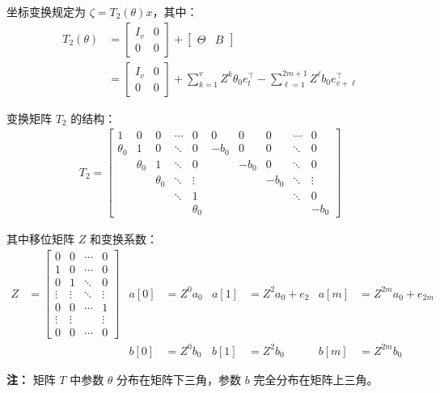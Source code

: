 \documentclass[12pt,a4paper]{article}
\begin{document}
坐标变换规定为 $\zeta = T_2(\theta) x$，其中：
\begin{align*}
T_2(\theta) &=
\begin{bmatrix}
I_v & 0 \\
0 & 0
\end{bmatrix} +
\left[
\begin{array}{c|c}
\Theta & B
\end{array}
\right] \\
&= \begin{bmatrix}
I_v & 0 \\
0 & 0
\end{bmatrix}
+ \sum_{k=1}^{v} Z^k \theta_0 e_t^\top
- \sum_{\ell=1}^{2m+1} Z^{\ell} b_0 e_{v+\ell}^\top
\end{align*}

变换矩阵 $T_2$ 的结构：
{\small
\begin{align*}
T_2 =
\left[
\begin{array}{ccccc|ccccc}
1 & 0 & 0 & \cdots & 0 & 0 & 0 & 0 & \cdots & 0 \\
\theta_0 & 1 & 0 & \ddots & 0 & -b_0 & 0 & 0 & \ddots & 0 \\
 & \theta_0 & 1 & \ddots & 0 &  & -b_0 & 0 & \ddots & 0 \\
 &  & \theta_0 & \ddots & \vdots &  &  & -b_0 & \ddots & \vdots \\
 &  &  & \ddots & 1 &  &  &  & \ddots & 0 \\
 &  &  &  & \theta_0 &  &  &  &  & -b_0
\end{array}
\right]
\end{align*}}

其中移位矩阵 $Z$ 和变换系数：
\begin{align*}
Z &= \begin{bmatrix}
0 & 0 & \cdots & 0 \\
1 & 0 & \cdots & 0 \\
0 & 1 & \ddots & 0 \\
\vdots & \vdots & \ddots & \vdots \\
0 & 0 & \cdots & 1 \\
\vdots & \vdots &  & \vdots \\
0 & 0 & \cdots & 0
\end{bmatrix} &
a[0] &= Z^0 a_0 & a[1] &= Z^2 a_0 + e_2 & a[m] &= Z^{2m} a_0 + e_{2m} \\
&& b[0] &= Z^0 b_0 & b[1] &= Z^2 b_0 & b[m] &= Z^{2m} b_0
\end{align*}

\textbf{注：} 矩阵 $T$ 中参数 $\theta$ 分布在矩阵下三角，参数 $b$ 完全分布在矩阵上三角。
\end{document}

